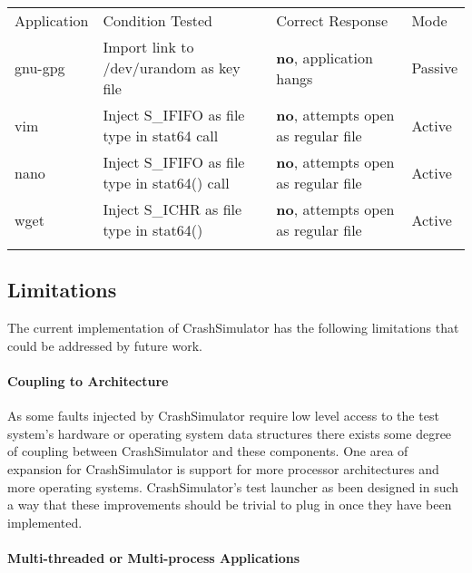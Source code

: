             \begin{table*}[t]
                \scriptsize{}
                \begin{tabular}{l  l  l  | l}
                \toprule{}
                  Application & Condition Tested & Correct Response & Mode\\
                  gnu-gpg & Import link to /dev/urandom as key file & \textbf{no}, application hangs & Passive\\
                  vim & Inject S\_IFIFO as file type in stat64 call & \textbf{no}, attempts open as regular file & Active\\
                  nano & Inject S\_IFIFO as file type in stat64() call & \textbf{no}, attempts open as regular file & Active\\
                  wget & Inject S\_ICHR as file type in stat64() & \textbf{no}, attempts open as regular file & Active\\
                \bottomrule{}
                \end{tabular}
            \end{table*}


    \subsection{Limitations}

        The current implementation of CrashSimulator has the following limitations that could be addressed by future work.

        \paragraph{Coupling to Architecture}

        As some faults injected by CrashSimulator require low level access to the test system's hardware or operating
        system data structures there exists some degree of coupling between CrashSimulator and these components. One
        area of expansion for CrashSimulator is support for more processor architectures and more operating systems.
        CrashSimulator's test launcher as been designed in such a way that these improvements should be trivial to plug
        in once they have been implemented.

        \paragraph{Multi-threaded or Multi-process Applications}

